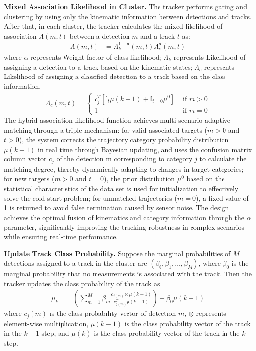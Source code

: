 \documentclass[lettersize,journal]{IEEEtran}
\begin{document}
\textbf{Mixed Association Likelihood in Cluster.}
The tracker performs gating and clustering by using only the kinematic information between detections and tracks. 
After that, in each cluster, the tracker calculates the mixed likelihood of association \(\Lambda(m,t)\) between a detection \(m\) and a track \(t\) as:
\begin{align}
	\Lambda(m, t) & = \Lambda_{k}^{1-\alpha}(m, t) \Lambda_{c}^{\alpha}(m, t)
\end{align}
where \(\alpha\) represents Weight factor of class likelihood; \(\Lambda_{k}\) represents Likelihood of assigning a detection to a track based on the kinematic states; \(\Lambda_{c}\) represents Likelihood of assigning a classified detection to a track based on the class information.
\begin{align}
	\Lambda_{c}(m, t) = \left\{\begin{array}{ll}
		c_{j}^{T}\left[\mathbb{I}_t \mu(k-1)+\mathbb{I}_{t = 0} \mu^{0}\right] & \text { if } m>0 \\
		1 & \text { if } m = 0
	\end{array}\right.
\end{align}
The hybrid association likelihood function achieves multi-scenario adaptive matching through a triple mechanism: for valid associated targets (\(m>0\) and \(t>0\)), the system corrects the trajectory category probability distribution \(\mu(k-1)\) in real time through Bayesian updating, and uses the confusion matrix column vector \(c_j\) of the detection m corresponding to category \(j\) to calculate the matching degree, thereby dynamically adapting to changes in target categories; for new targets (\(m>0\) and \(t=0\)), the prior distribution \(\mu^{0}\) based on the statistical characteristics of the data set is used for initialization to effectively solve the cold start problem; for unmatched trajectories (\(m=0\)), a fixed value of 1 is returned to avoid false termination caused by sensor noise. The design achieves the optimal fusion of kinematics and category information through the \(\alpha\) parameter, significantly improving the tracking robustness in complex scenarios while ensuring real-time performance.

\textbf{Update Track Class Probability.}
Suppose the marginal probabilities of \(M\) detections assigned to a track in the cluster are \(\left(\beta_{0}, \beta_{1}, \ldots, \beta_{M}\right)\), where \(\beta_{0}\) is the marginal probability that no measurements is associated with the track. 
Then the tracker updates the class probability of the track as
\begin{align}
	\mu_{k} & = \left(\sum_{m = 1}^{M} \beta_{m} \frac{c_{j(m)} \otimes \mu(k-1)}{c_{j(m)}^{T} \mu(k-1)}\right)+\beta_{0} \mu(k-1)
\end{align}
where \(c_{j}(m)\) is the class probability vector of detection \(m\), \(\otimes\) represents element-wise multiplication, \(\mu(k-1)\) is the class probability vector of the track in the \(k-1\) step, and \(\mu(k)\) is the class probability vector of the track in the \(k\) step.
\end{document}
